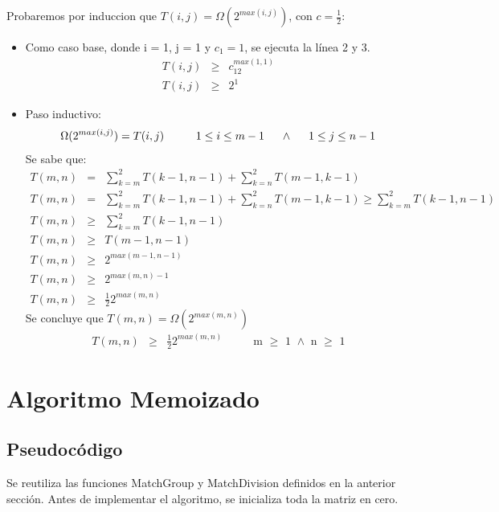 \documentclass{article}
\begin{document}
Probaremos por induccion que $T(i,j)=\Omega(2^{max(i,j)})$, con $c = \frac{1}{2}$:

\begin{itemize}
\item Como caso base, donde i = 1, j = 1 y $c_1 = 1$, se ejecuta la línea 2 y 3.
\begin{eqnarray*}
T(i,j) & \geq & c_12^{max(1,1)} \\
T(i,j) & \geq & 2^1 
\end{eqnarray*}
\item Paso inductivo:
\begin{eqnarray*}
\Omega(2^{max(i,j)}) = T(i,j) \hspace{1cm} 1 \leq i \leq m-1 \hspace{0.5cm} \wedge \hspace{0.5cm} 1 \leq j \leq n-1 \\
\end{eqnarray*}
Se sabe que:
\begin{eqnarray*}
T(m,n) &=& \sum^2_{k=m}T(k-1,n-1)+\sum^{2}_{k=n}T(m-1,k-1) \\
T(m,n) &=& \sum^2_{k=m}T(k-1,n-1)+\sum^{2}_{k=n}T(m-1,k-1) \geq \sum^2_{k=m}T(k-1,n-1) \\
T(m,n) &\geq& \sum^2_{k=m}T(k-1,n-1) \\
T(m,n) &\geq& T(m-1,n-1) \\
T(m,n) &\geq& 2^{max(m-1,n-1)} \\
T(m,n) &\geq& 2^{max(m,n)-1} \\
T(m,n) &\geq& \frac{1}{2}2^{max(m,n)}
\end{eqnarray*}
Se concluye que $T(m,n)=\Omega(2^{max(m,n)})$
\begin{eqnarray*}
T(m,n) &\geq& \frac{1}{2}2^{max(m,n)} \hspace{1cm} \text{ m $\geq$ 1 $\wedge$ n $\geq$ 1}
\end{eqnarray*}

\end{itemize}

\section{Algoritmo Memoizado}

\subsection{Pseudocódigo}
Se reutiliza las funciones MatchGroup y MatchDivision definidos en la anterior sección. Antes de implementar el algoritmo, se inicializa toda la matriz en cero.
\end{document}
